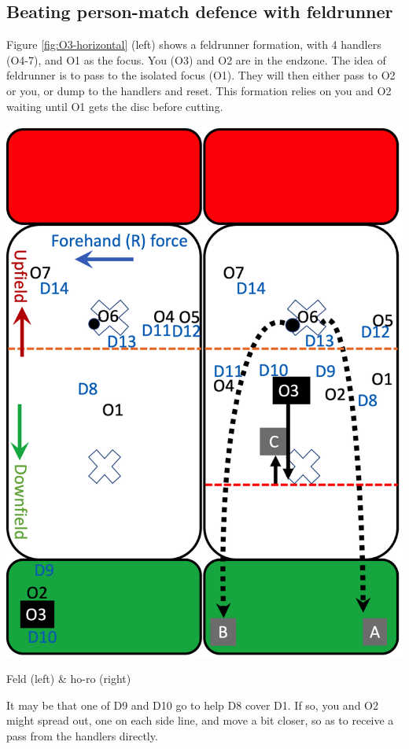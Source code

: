 \documentclass{tufte-handout}
\begin{document}
\subsection{Beating person-match defence with feldrunner}
\label{sec:feld}
Figure \ref{fig:O3-horizontal} (left) 
shows a feldrunner formation, 
with 4 handlers (O4-7), 
and O1 as the focus.
You  
(O3) 
and O2
are in the endzone. The idea of feldrunner 
is to pass to 
the isolated
focus (O1). 
They will then either pass to 
O2 or you, 
or dump to the handlers
and reset. This formation relies 
on you and O2 
waiting until O1 
gets the disc 
before cutting.  
\begin{marginfigure}%
  \includegraphics[width=\linewidth]{O3-horizontal}
  \caption{Feld (left) \& ho-ro (right)}
  \label{fig:O3-horizontal}
\end{marginfigure}

It may be that 
one of 
D9 
and D10 
go to help D8 
cover D1.  
If so, 
you and O2 
might spread out, 
one on each side line,
and move a bit closer, 
so as to receive a pass from 
the handlers directly.  
\end{document}
